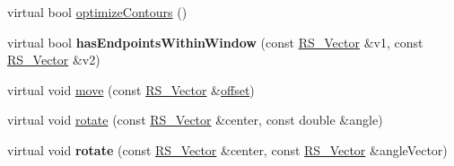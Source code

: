\begin{DoxyCompactItemize}
\item 
virtual bool \hyperlink{classRS__EntityContainer_adea2559f9436bf166cd3a09af60a6c1b}{optimize\-Contours} ()
\item 
\hypertarget{classRS__EntityContainer_a8392507178b10902d44f6c267c978b69}{virtual bool {\bfseries has\-Endpoints\-Within\-Window} (const \hyperlink{classRS__Vector}{R\-S\-\_\-\-Vector} \&v1, const \hyperlink{classRS__Vector}{R\-S\-\_\-\-Vector} \&v2)}\label{classRS__EntityContainer_a8392507178b10902d44f6c267c978b69}

\item 
virtual void \hyperlink{classRS__EntityContainer_a7a12575ce16c4b34e198b42eab47ba0f}{move} (const \hyperlink{classRS__Vector}{R\-S\-\_\-\-Vector} \&\hyperlink{classRS__Entity_aa296d21b9aac99161d386ce2f60f0fea}{offset})
\item 
virtual void \hyperlink{classRS__EntityContainer_a61223b4cae4966ab65e1d06d2d8eaccb}{rotate} (const \hyperlink{classRS__Vector}{R\-S\-\_\-\-Vector} \&center, const double \&angle)
\item 
\hypertarget{classRS__EntityContainer_a0592d0763389c952753dea117d916ec8}{virtual void {\bfseries rotate} (const \hyperlink{classRS__Vector}{R\-S\-\_\-\-Vector} \&center, const \hyperlink{classRS__Vector}{R\-S\-\_\-\-Vector} \&angle\-Vector)}\label{classRS__EntityContainer_a0592d0763389c952753dea117d916ec8}


\end{DoxyCompactItemize}
